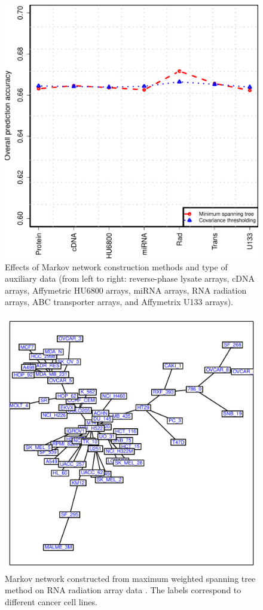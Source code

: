 \documentclass[english]{tktltiki}
\begin{document}
\begin{figure}[t]
\begin{center}
\centering
\includegraphics[width=0.65\columnwidth]{./plots/graph_effect.pdf}
\caption[Effects on Markov network in MMCRF.]{Effects of Markov network construction methods and type of auxiliary data (from left to right: reverse-phase lysate arrays, cDNA arrays, Affymetric HU6800 arrays, miRNA arrays, RNA radiation arrays, ABC transporter arrays, and Affymetrix U133 arrays). }
\label{graph_effect}
\end{center}
\end{figure}

\begin{figure}[h]
\begin{center}
\centering
\includegraphics[width=0.65\columnwidth]{./plots/net.pdf}
\caption[Spanning tree from RNA radiation array.]{Markov network constructed from maximum weighted spanning tree method on RNA radiation array data \cite{shankavaram09}. The labels correspond to different cancer cell lines.}
\label{net}
\end{center}
\end{figure}
\end{document}
